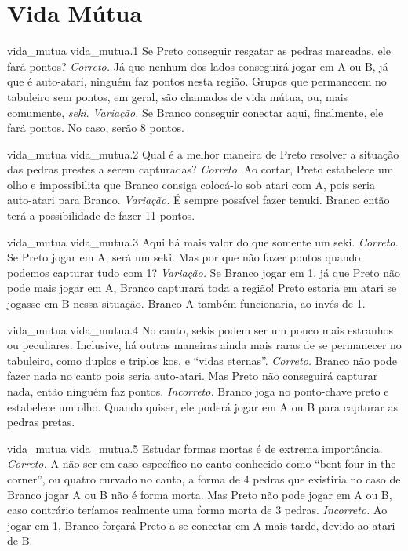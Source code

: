 \chapter{Vida Mútua}

\emptypage

\problemAnswerDiagram
  {vida_mutua}
  {vida_mutua.1}
  {Se Preto conseguir resgatar as pedras marcadas, ele fará pontos?}
  {\emph{Correto.} Já que nenhum dos lados conseguirá jogar em A ou B, já que é auto-atari, ninguém faz pontos nesta região. Grupos que permanecem no tabuleiro sem pontos, em geral, são chamados de vida mútua, ou, mais comumente, \emph{seki}.}
  {\emph{Variação.} Se Branco conseguir conectar aqui, finalmente, ele fará pontos. No caso, serão 8 pontos.}

\problemAnswerDiagram
  {vida_mutua}
  {vida_mutua.2}
  {Qual é a melhor maneira de Preto resolver a situação das pedras prestes a serem capturadas?}
  {\emph{Correto.} Ao cortar, Preto estabelece um olho e impossibilita que Branco consiga colocá-lo sob atari com A, pois seria auto-atari para Branco.}
  {\emph{Variação.} É sempre possível fazer tenuki. Branco então terá a possibilidade de fazer 11 pontos.}

\problemAnswerDiagram
  {vida_mutua}
  {vida_mutua.3}
  {Aqui há mais valor do que somente um seki.}
  {\emph{Correto.} Se Preto jogar em A, será um seki. Mas por que não fazer pontos quando podemos capturar tudo com 1?}
  {\emph{Variação.} Se Branco jogar em 1, já que Preto não pode mais jogar em A, Branco capturará toda a região! Preto estaria em atari se jogasse em B nessa situação. Branco A também funcionaria, ao invés de 1.}

\problemAnswerDiagram
  {vida_mutua}
  {vida_mutua.4}
  {No canto, sekis podem ser um pouco mais estranhos ou peculiares. Inclusive, há outras maneiras ainda mais raras de se permanecer no tabuleiro, como duplos e triplos kos, e ``vidas eternas''.}
  {\emph{Correto.} Branco não pode fazer nada no canto pois seria auto-atari. Mas Preto não conseguirá capturar nada, então ninguém faz pontos.}
  {\emph{Incorreto.} Branco joga no ponto-chave preto e estabelece um olho. Quando quiser, ele poderá jogar em A ou B para capturar as pedras pretas.}


\problemAnswerDiagram
  {vida_mutua}
  {vida_mutua.5}
  {Estudar formas mortas é de extrema importância.}
  {\emph{Correto.} A não ser em caso específico no canto conhecido como ``bent four in the corner'', ou quatro curvado no canto, a forma de 4 pedras que existiria no caso de Branco jogar A ou B não é forma morta. Mas Preto não pode jogar em A ou B, caso contrário teríamos realmente uma forma morta de 3 pedras.}
  {\emph{Incorreto.} Ao jogar em 1, Branco forçará Preto a se conectar em A mais tarde, devido ao atari de B.}